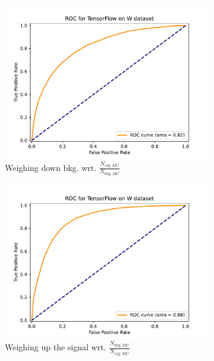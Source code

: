 \documentclass[12pt, a4paper]{book}
\begin{document}
\clearpage
\begin{figure}[!ht]
	\centering
	\begin{subfigure}[b]{0.49\textwidth}
         \centering
         \includegraphics[width=1\textwidth]{bkg_MC/ROC.pdf}
         \caption{Weighing down bkg. wrt. $\frac{N_{sig,MC}}{N_{bkg,MC}}$ }
      \end{subfigure}
      \hfill
      \begin{subfigure}[b]{0.49\textwidth}
         \centering
         \includegraphics[width=1\textwidth]{sig_MC/ROC.pdf}
         \caption{Weighing up the signal wrt. $\frac{N_{bkg,MC}}{N_{sig,MC}}$}
      \end{subfigure}
      \hfill
      \begin{subfigure}[b]{0.49\textwidth}

\end{subfigure}
\end{figure}
\end{document}
